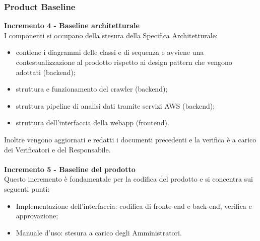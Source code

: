 {{    \subsubsection{Product Baseline} {
    \textbf{Incremento 4 - Baseline architetturale} \\
    I componenti si occupano della stesura della Specifica Architetturale: 
    \begin{itemize}
        \item contiene i diagrammi delle classi e di sequenza e avviene una contestualizzazione al prodotto rispetto ai design pattern che vengono adottati (backend);
        \item struttura e funzionamento del crawler (backend);
        \item struttura pipeline di analisi dati tramite servizi AWS (backend);
        \item struttura dell'interfaccia della webapp (frontend).
    \end{itemize}
    Inoltre vengono aggiornati e redatti i documenti precedenti e la verifica è a carico dei Verificatori e del Responsabile.\\ \\
    \textbf{Incremento 5 - Baseline del prodotto} \\
    Questo incremento è fondamentale per la codifica del prodotto e si concentra sui seguenti punti:
    \begin{itemize}
        \item Implementazione dell'interfaccia: codifica di fronte-end e back-end, verifica e approvazione;
        \item Manuale d'uso: stesura a carico degli Amministratori.
    \end{itemize}
    }

}}
